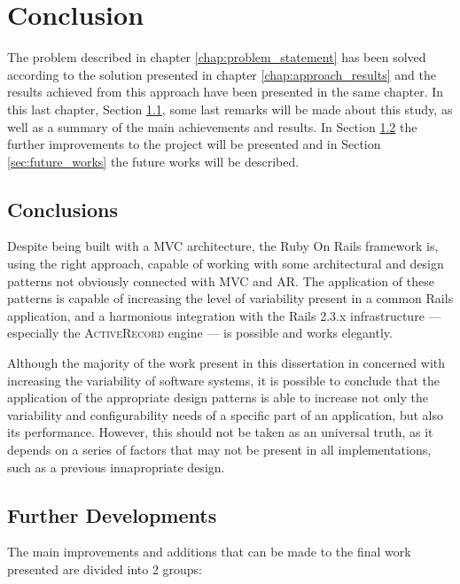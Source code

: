 \chapter{Conclusion}\label{chap:conclusion}

The problem described in chapter \ref{chap:problem_statement} has been solved according to the solution presented in chapter \ref{chap:approach_results} and the results achieved from this approach have been presented in the same chapter. In this last chapter, Section \ref{sec:conclusions}, some last remarks will be made about this study, as well as a summary of the main achievements and results. In Section \ref{sec:further_developments} the further improvements to the project will be presented and in Section \ref{sec:future_works} the future works will be described.

\section{Conclusions}\label{sec:conclusions}

Despite being built with a MVC architecture, the Ruby On Rails framework is, using the right approach, capable of working with some architectural and design patterns not obviously connected with MVC and AR. The application of these patterns is capable of increasing the level of variability present in a common Rails application, and a harmonious integration with the Rails 2.3.x infrastructure --- especially the \textsc{ActiveRecord} engine --- is possible and works elegantly.

Although the majority of the work present in this dissertation in concerned with increasing the variability of software systems, it is possible to conclude that the application of the appropriate design patterns is able to increase not only the variability and configurability needs of a specific part of an application, but also its performance. However, this should not be taken as an universal truth, as it depends on a series of factors that may not be present in all implementations, such as a previous innapropriate design.

\section{Further Developments}\label{sec:further_developments}

The main improvements and additions that can be made to the final work presented are divided into 2 groups:

